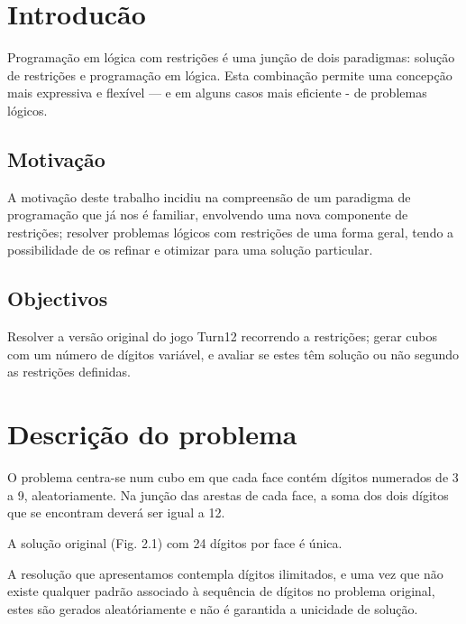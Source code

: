 %
%

\section{Introducão}
\label{introduction} %

Programação em lógica com restrições é uma junção de dois paradigmas: solução de restrições e programação em lógica. Esta combinação permite uma concepção mais expressiva e flexível — e em alguns casos mais eficiente - de problemas lógicos.

\subsection{Motivação}
\label{sec:1}
A motivação deste trabalho incidiu na compreensão de um paradigma de programação que já nos é familiar, envolvendo uma nova componente de restrições; resolver problemas lógicos com restrições de uma forma geral, tendo a possibilidade de os refinar e otimizar para uma solução particular.

\subsection{Objectivos}
\label{sec:2}
Resolver a versão original do jogo Turn12 recorrendo a restrições; gerar cubos com um número de dígitos variável, e avaliar se estes têm solução ou não segundo as restrições definidas.


\section{Descrição do problema}
\label{sec:3}
O problema centra-se num cubo em que cada face contém dígitos numerados de 3 a 9, aleatoriamente. Na junção das arestas de cada face, a soma dos dois dígitos que se encontram deverá ser igual a 12.

A solução original (Fig. 2.1) com 24 dígitos por face é única.

A resolução que apresentamos contempla dígitos ilimitados, e uma vez que não existe qualquer padrão associado à sequência de dígitos no problema original, estes são gerados aleatóriamente e não é garantida a unicidade de solução.

